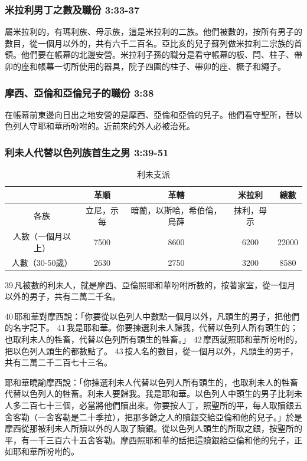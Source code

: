 \subsubsection{米拉利男丁之數及職份 3:33-37}
屬米拉利的，有瑪利族、母示族，這是米拉利的二族。他們被數的，按所有男子的數目，從一個月以外的，共有六千二百名。亞比亥的兒子蘇列做米拉利二宗族的首領。他們要在帳幕的北邊安營。米拉利子孫的職分是看守帳幕的板、閂、柱子、帶卯的座和帳幕一切所使用的器具，院子四圍的柱子、帶卯的座、橛子和繩子。

\subsubsection{摩西、亞倫和亞倫兒子的職份 3:38}
在帳幕前東邊向日出之地安營的是摩西、亞倫和亞倫的兒子。他們看守聖所，替以色列人守耶和華所吩咐的。近前來的外人必被治死。 

\subsubsection{利未人代替以色列族首生之男 3:39-51}
\begin{table}[H]
\centering
\begin{tabular}{c|c|c|c|c}
\hline
\hline
    &革順  & 革轄  & 米拉利&  總數  \\
\hline
各族     & 立尼，示每 & 暗蘭，以斯哈，希伯倫，烏薛  & 抹利，母示&   \\
\hline
人數（一個月以上）&7500&8600&6200&22000  \\ 
\hline
人數（30-50歲）& 2630 &  2750 &3200&8580  \\
\hline
\end{tabular}
\caption{利未支派}
\end{table}
39 凡被數的利未人，就是摩西、亞倫照耶和華吩咐所數的，按著家室，從一個月以外的男子，共有二萬二千名。

40 耶和華對摩西說：「你要從以色列人中數點一個月以外，凡頭生的男子，把他們的名字記下。 41 我是耶和華。你要揀選利未人歸我，代替以色列人所有頭生的；也取利未人的牲畜，代替以色列所有頭生的牲畜。」 42 摩西就照耶和華所吩咐的，把以色列人頭生的都數點了。 43 按人名的數目，從一個月以外，凡頭生的男子，共有二萬二千二百七十三名。

 耶和華曉諭摩西說：「你揀選利未人代替以色列人所有頭生的，也取利未人的牲畜代替以色列人的牲畜。利未人要歸我。我是耶和華。以色列人中頭生的男子比利未人多二百七十三個，必當將他們贖出來。你要按人丁，照聖所的平，每人取贖銀五舍客勒（一舍客勒是二十季拉），把那多餘之人的贖銀交給亞倫和他的兒子。」於是摩西從那被利未人所贖以外的人取了贖銀。從以色列人頭生的所取之銀，按聖所的平，有一千三百六十五舍客勒。摩西照耶和華的話把這贖銀給亞倫和他的兒子，正如耶和華所吩咐的。

